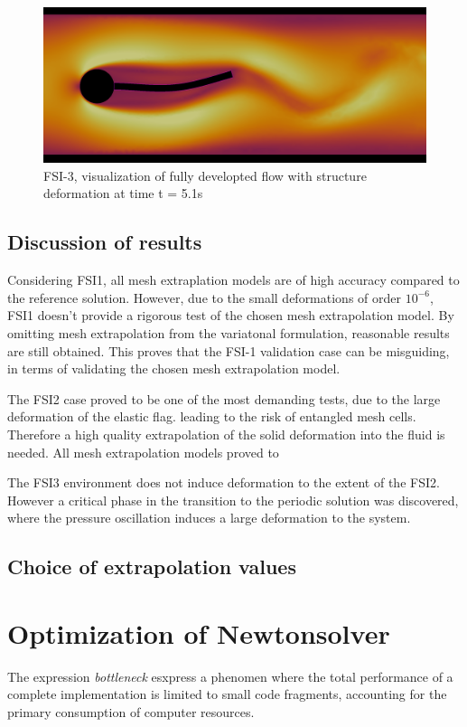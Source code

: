 \begin{figure}[h!]
  \centering
    \includegraphics[scale=0.2]{./Fig/fsi3flow.png}
      \caption{FSI-3, visualization of fully developted flow with structure deformation at time t = 5.1s}
\end{figure}

\newpage
\subsection{Discussion of results}
Considering FSI1, all mesh extraplation models are of high accuracy compared to the reference solution.  However, due to the small deformations of order $10^{-6}$, FSI1 doesn't provide a rigorous test of the chosen mesh extrapolation model. By omitting mesh extrapolation from the variatonal formulation,  reasonable results are still obtained. This proves that the FSI-1 validation case can be misguiding, in terms of validating the chosen mesh extrapolation model. 

The FSI2 case proved to be one of the most demanding tests, due to the large deformation of the elastic flag. leading to the risk of entangled mesh cells. Therefore a high quality extrapolation of the solid deformation into the fluid is needed. All mesh extrapolation models proved to

The FSI3 environment does not induce deformation to the extent of the FSI2. However a critical phase in the transition to the periodic solution was discovered, where the pressure oscillation induces a large deformation to the system.

\subsection{Choice of extrapolation values}

\newpage
\section{Optimization of Newtonsolver}
The expression \textit{bottleneck} esxpress a phenomen where the total performance of a complete implementation is limited to small code fragments, accounting for the primary consumption of computer resources.

